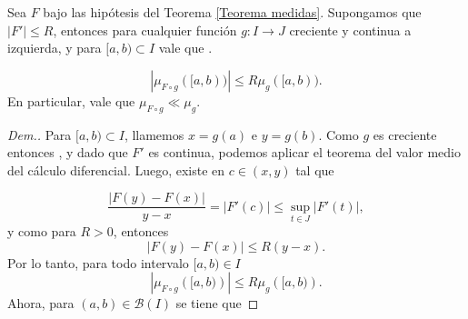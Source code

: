 \begin{lem}
Sea $F$ bajo las hipótesis del Teorema \ref{Teorema medidas}. Supongamos que $|F'|\leq R$, entonces para cualquier función $g:I\to J$ creciente y continua a izquierda, y para $[a,b)\subset I$  vale que \comment{Demostrar la desigual para todo boreliano $A\subset I$, no solo para $A=[a,b)$}. 

\begin{equation}
    |\mu_{F\circ g}([a,b))|\leq R\mu_{g}([a,b)).
\end{equation}
En particular, vale que $\mu_{F\circ g}\ll \mu_g$.\label{lem: abs cont}
\end{lem}
\begin{proof}[Dem.]

Para $[a,b)\subset I$, llamemos $x=g(a)$ e $y=g(b)$. Como $g$ es creciente entonces , y dado que $F'$ es continua, podemos aplicar el  teorema del valor medio del cálculo diferencial. Luego, existe en $c\in (x,y)$ tal que 

	$$ \dfrac{|F(y)-F(x)|}{y-x} =  |F'(c)| \leq \sup_{t\in J}\left|F'(t) \right|, $$
	y como  para $R>0$, entonces
	\begin{equation} \label{eq:f'}
		 |F(y)-F(x)| \leq R (y-x).
	\end{equation}
Por lo tanto, para todo intervalo $[a,b)\in I$
	\begin{equation*}
		|\mu_{F\circ g}\left( [a,b)\right)|\leq R\mu_{g}\left( [a,b)\right).
		\label{eq:medidas}
	\end{equation*}
Ahora, para $(a,b)\in \mathcal{B}(I)$ se tiene que
 


\end{proof}
